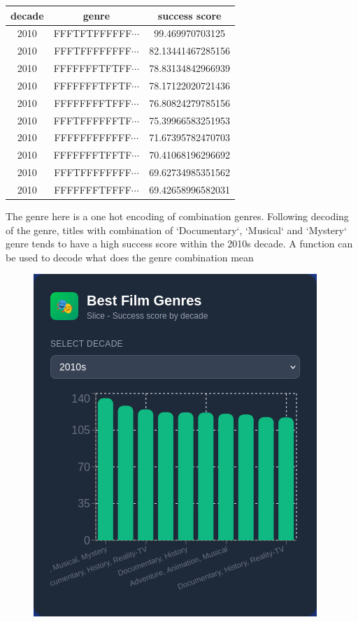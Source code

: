 \begin{center}
	\begin{tabular}{|c|c|c|}
\hline
decade & genre & success score\\
\hline
2010 & FFFTFTFFFFFF$\cdots$ & 99.469970703125\\
2010 & FFFTFFFFFFFF$\cdots$ & 82.13441467285156\\
2010 & FFFFFFFTFTFF$\cdots$ & 78.83134842966939\\
2010 & FFFFFFFTFFTF$\cdots$ & 78.17122020721436\\
2010 & FFFFFFFFTFFF$\cdots$ & 76.80824279785156\\
2010 & FFFTFFFFFFTF$\cdots$ & 75.39966583251953\\
2010 & FFFFFFFFFFFF$\cdots$ & 71.67395782470703\\
2010 & FFFFFFFTFFTF$\cdots$ & 70.41068196296692\\
2010 & FFFTFFFFFFFF$\cdots$ & 69.62734985351562\\
2010 & FFFFFFFTFFFF$\cdots$ & 69.42658996582031\\
\hline
\end{tabular}
\end{center}

The genre here is a one hot encoding of combination genres. Following decoding of the genre, titles with combination of `Documentary`, `Musical` and `Mystery` genre tends to have a high success score within the 2010s decade. A function can be used to decode what does the genre combination mean 

\begin{figure}[h!]
	\centering
	\includegraphics[width=0.7\linewidth]{images/image1.png}
	\caption{}
\end{figure}


